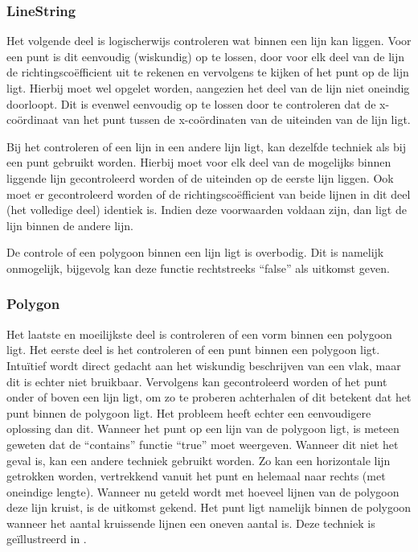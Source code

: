 \subsubsection{LineString}
Het volgende deel is logischerwijs controleren wat binnen een lijn kan liggen. Voor een punt is dit eenvoudig (wiskundig) op te lossen, door voor elk deel van de lijn de richtingscoëfficient uit te rekenen en vervolgens te kijken of het punt op de lijn ligt. Hierbij moet wel opgelet worden, aangezien het deel van de lijn niet oneindig doorloopt. Dit is evenwel eenvoudig op te lossen door te controleren dat de x-coördinaat van het punt tussen de x-coördinaten van de uiteinden van de lijn ligt.

Bij het controleren of een lijn in een andere lijn ligt, kan dezelfde techniek als bij een punt gebruikt worden. Hierbij moet voor elk deel van de mogelijks binnen liggende lijn gecontroleerd worden of de uiteinden op de eerste lijn liggen. Ook moet er gecontroleerd worden of de richtingscoëfficient van beide lijnen in dit deel (het volledige deel) identiek is. Indien deze voorwaarden voldaan zijn, dan ligt de lijn binnen de andere lijn. 

De controle of een polygoon binnen een lijn ligt is overbodig. Dit is namelijk onmogelijk, bijgevolg kan deze functie rechtstreeks ``false'' als uitkomst geven.

\subsubsection{Polygon}
Het laatste en moeilijkste deel is controleren of een vorm binnen een polygoon ligt. Het eerste deel is het controleren of een punt binnen een polygoon ligt. Intuïtief wordt direct gedacht aan het wiskundig beschrijven van een vlak, maar dit is echter niet bruikbaar. Vervolgens kan gecontroleerd worden of het punt onder of boven een lijn ligt, om zo te proberen achterhalen of dit betekent dat het punt binnen de polygoon ligt. Het probleem heeft echter een eenvoudigere oplossing dan dit. Wanneer het punt op een lijn van de polygoon ligt, is meteen geweten dat de ``contains'' functie ``true'' moet weergeven. Wanneer dit niet het geval is, kan een andere techniek gebruikt worden. Zo kan een horizontale lijn getrokken worden, vertrekkend vanuit het punt en helemaal naar rechts (met oneindige lengte). Wanneer nu geteld wordt met hoeveel lijnen van de polygoon deze lijn kruist, is de uitkomst gekend. Het punt ligt namelijk binnen de polygoon wanneer het aantal kruissende lijnen een oneven aantal is. Deze techniek is geïllustreerd in .


